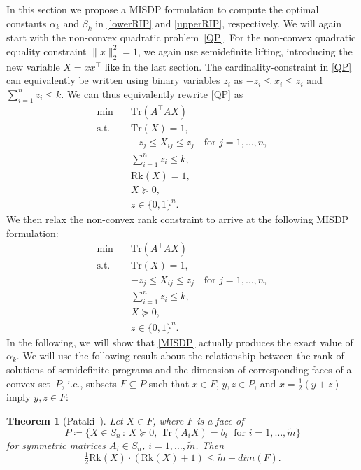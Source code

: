 \documentclass[journal]{IEEEtran}
\newtheorem{theorem}{Theorem}
\newcommand{\suchthat}{\,:\,}
\newcommand{\define}{\coloneqq}
\newcommand{\Norm}[2]{\lVert{#1}\rVert_{#2}}
\newcommand{\T}{^{\top}}
\newcommand{\Tr}{\text{Tr}}
\newcommand{\Rk}{\text{Rk}}
\begin{document}
\noindent
In this section we propose a MISDP formulation to compute the optimal
constants $\alpha_k$ and $\beta_k$ in \eqref{lowerRIP} and
\eqref{upperRIP}, respectively. We will again start with the non-convex quadratic problem~\eqref{QP}.
For the non-convex quadratic equality constraint $\Norm{x}{2}^2 = 1$, we
again use semidefinite lifting, introducing the new variable $X=xx\T$ like in the last section. 
The cardinality-constraint in \eqref{QP} can equivalently be written using
binary variables $z_i$ as $-z_i \leq x_i \leq z_i$ and $\sum_{i=1}^n z_i
\leq k$. We can thus equivalently rewrite \eqref{QP} as
\begin{align}\label{Rk1MISDP}
 \min \quad & \Tr(A\T A X) \nonumber \\
 \text{s.t.} \quad & \Tr(X) = 1, \nonumber \\
 & -z_j \leq X_{ij} \leq z_j \quad \text{for } j = 1, \dots, n, \nonumber \\
 & \sum_{i=1}^n z_i \leq k,\\
 & \Rk(X) = 1, \nonumber \\
 & X \succeq 0,  \nonumber \\
 & z \in \{0,1\}^n. \nonumber
\end{align}
We then relax the non-convex rank constraint to arrive at the following
MISDP formulation:
\begin{align}\label{MISDP}
 \min \quad & \Tr(A\T A X) \nonumber \\
 \text{s.t.} \quad & \Tr(X) = 1, \nonumber \\
 & -z_j \leq X_{ij} \leq z_j \quad \text{for } j = 1, \dots, n, \nonumber \\
 & \sum_{i=1}^n z_i \leq k, \tag{MISDP} \\
 & X \succeq 0,  \nonumber \\
 & z \in \{0,1\}^n. \nonumber
\end{align}
In the following, we will show that \eqref{MISDP} actually produces the
exact value of $\alpha_k$. We will use the following result about the
relationship between the rank of solutions of semidefinite programs and the
dimension of corresponding faces of a convex set~$P$, i.e., subsets $F
\subseteq P$ such that $x \in F$, $y, z \in P$, and $x = \tfrac{1}{2} (y + z)$ imply
$y,z \in F$:

\begin{theorem}[Pataki~\cite{pat98}]\label{patakiLemma}
  Let $X \in F$, where $F$ is a face of
  \begin{equation*}
    P \define \{X \in S_n \suchthat X \succeq 0,\; \Tr(A_i X) = b_i\; \text{ for } i = 1, \dots, \tilde{m}\}
  \end{equation*}
  for symmetric matrices $A_i \in S_n$, $i = 1, \dots, \tilde{m}$. Then
  \begin{equation*}
    \tfrac{1}{2}\Rk(X)\cdot(\Rk(X)+1) \leq \tilde{m} + dim(F).
  \end{equation*}
\end{theorem}
\end{document}
